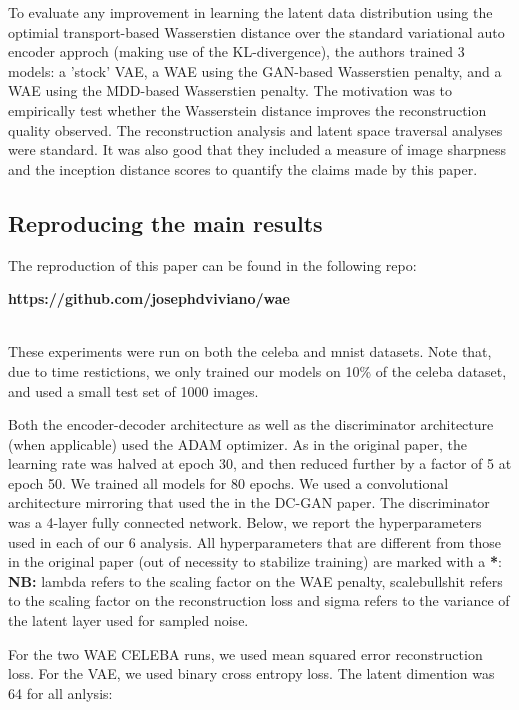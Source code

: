 \documentclass[12pt,english]{amsart}
\theoremstyle{definition}
\begin{document}
To evaluate any improvement in learning the latent data distribution using
the optimial transport-based Wasserstien distance over the standard variational
auto encoder approch (making use of the KL-divergence), the authors trained 3
models: a 'stock' VAE, a WAE using the GAN-based Wasserstien penalty, and a WAE
using the MDD-based Wasserstien penalty. The motivation was to empirically test
whether the Wasserstein distance improves the reconstruction quality observed.
The reconstruction analysis and latent space traversal analyses were standard.
It was also good that they included a measure of image sharpness and the
inception distance scores to quantify the claims made by this paper.

\subsection{Reproducing the main results}

The reproduction of this paper can be found in the following repo:\\

\begin{center}\textbf{https://github.com/josephdviviano/wae}\end{center}\\

These experiments were run on both the celeba and mnist datasets. Note that,
due to time restictions, we only trained our models on 10\% of the celeba
dataset, and used a small test set of 1000 images.

Both the encoder-decoder architecture as well as the discriminator architecture
(when applicable) used the ADAM optimizer. As in the original paper, the
learning rate was halved at epoch 30, and then reduced further by a factor of 5
at epoch 50. We trained all models for 80 epochs. We used a convolutional
architecture mirroring that used the in the DC-GAN paper. The discriminator was
a 4-layer fully connected network. Below, we report the  hyperparameters used in
each of our 6 analysis. All hyperparameters that are different from those in the
original paper (out of necessity to stabilize training) are marked with a
\textbf{*}:\\

\textbf{NB:} lambda refers to the scaling factor on the WAE penalty,
scalebullshit refers to the scaling factor on the reconstruction loss and sigma
refers to the variance of the latent layer used for sampled noise.

For the two WAE CELEBA runs, we used mean squared error reconstruction loss.
For the VAE, we used binary cross entropy loss. The latent dimention was 64
for all anlysis: \\
\end{document}
